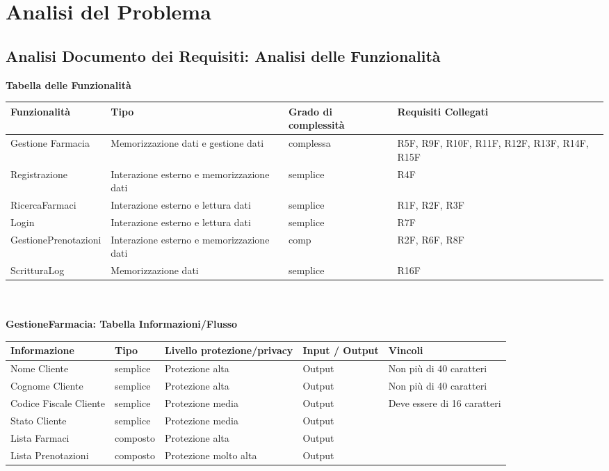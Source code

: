 \newpage
\section{Analisi del Problema}
\subsection{Analisi Documento dei Requisiti: Analisi delle Funzionalità}

\textbf{Tabella delle Funzionalità}
\\

\begin{tabular} {|P{4cm}|P{4cm}|P{3.5cm}|P{4cm}|} %
\hline
    \textbf{Funzionalità} & \textbf{Tipo} & \textbf{Grado di complessità} & \textbf{Requisiti Collegati} \\
\hline
    Gestione Farmacia & Memorizzazione dati e gestione dati & complessa & R5F, R9F, R10F, R11F, R12F, R13F, R14F, R15F \\
\hline
    Registrazione & Interazione esterno e memorizzazione dati & semplice & R4F \\
\hline
    RicercaFarmaci  &  Interazione esterno e lettura dati  &  semplice  &   R1F, R2F, R3F \\
\hline
    Login  &  Interazione esterno e lettura dati  &  semplice  &   R7F \\
\hline
    GestionePrenotazioni  &  Interazione esterno e memorizzazione dati  &  comp  &   R2F, R6F, R8F \\
\hline
    ScritturaLog  &  Memorizzazione dati  &  semplice  &   R16F \\
\hline
\end{tabular}
\\
\\

\textbf{GestioneFarmacia: Tabella Informazioni/Flusso}
\newline

\begin{tabular} {|P{3cm}|P{3cm}|P{3cm}|P{3cm}|P{3cm}|}
\hline
    \textbf{Informazione} & \textbf{Tipo} & \textbf{Livello protezione/privacy} & \textbf{Input / Output} & \textbf{Vincoli}\\
\hline
    Nome Cliente & semplice & Protezione alta & Output & Non più di 40 caratteri \\
\hline
    Cognome Cliente & semplice & Protezione alta & Output & Non più di 40 caratteri \\
\hline
     Codice Fiscale Cliente & semplice & Protezione media & Output & Deve essere di 16 caratteri \\
\hline
     Stato Cliente & semplice & Protezione media & Output & \\
\hline
     Lista Farmaci & composto & Protezione alta & Output & \\
\hline
     Lista Prenotazioni & composto & Protezione molto alta & Output & \\
\hline
\end{tabular}
